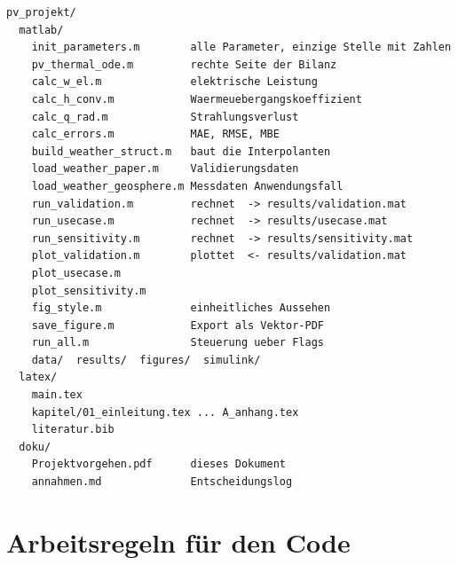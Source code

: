 \documentclass[11pt,a4paper]{scrartcl}
\begin{document}
\begin{verbatim}
pv_projekt/
  matlab/
    init_parameters.m        alle Parameter, einzige Stelle mit Zahlen
    pv_thermal_ode.m         rechte Seite der Bilanz
    calc_w_el.m              elektrische Leistung
    calc_h_conv.m            Waermeuebergangskoeffizient
    calc_q_rad.m             Strahlungsverlust
    calc_errors.m            MAE, RMSE, MBE
    build_weather_struct.m   baut die Interpolanten
    load_weather_paper.m     Validierungsdaten
    load_weather_geosphere.m Messdaten Anwendungsfall
    run_validation.m         rechnet  -> results/validation.mat
    run_usecase.m            rechnet  -> results/usecase.mat
    run_sensitivity.m        rechnet  -> results/sensitivity.mat
    plot_validation.m        plottet  <- results/validation.mat
    plot_usecase.m
    plot_sensitivity.m
    fig_style.m              einheitliches Aussehen
    save_figure.m            Export als Vektor-PDF
    run_all.m                Steuerung ueber Flags
    data/  results/  figures/  simulink/
  latex/
    main.tex
    kapitel/01_einleitung.tex ... A_anhang.tex
    literatur.bib
  doku/
    Projektvorgehen.pdf      dieses Dokument
    annahmen.md              Entscheidungslog
\end{verbatim}

\section{Arbeitsregeln f\"ur den Code}
\end{document}
